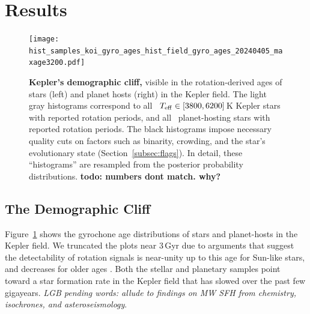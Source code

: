 \documentclass[11pt,twocolumn,tighten]{aastex63}
\begin{document}
\section{Results}
\label{sec:results}

\begin{figure}[!t]
	\begin{center}
		\leavevmode
		\texttt{[image: hist\_samples\_koi\_gyro\_ages\_hist\_field\_gyro\_ages\_20240405\_maxage3200.pdf]}
	\end{center}
	\vspace{-0.6cm}
	\caption{
		{\bf Kepler's demographic cliff,} visible in the
		rotation-derived ages of stars (left) and planet hosts
		(right) in the Kepler field.
		The 
		light gray histograms correspond to all
		\nuniqstarsantosrotteffcut\
		$T_{\rm eff}\in[3800,6200]\,$K Kepler stars with reported
		rotation periods, and all 
		\nplhoststarwgyroage\ planet-hosting stars with reported
		rotation periods.
		The black histograms impose necessary quality cuts
		on factors such as
		binarity, crowding, and the star's evolutionary state
		(Section~\ref{subsec:flags}).
		In detail, these ``histograms'' are resampled from the posterior
		probability distributions.
		{\bf todo: numbers dont match.  why?}
		\label{fig:hist_tgyro}
	}
\end{figure}

\subsection{The Demographic Cliff}

Figure~\ref{fig:hist_tgyro} shows the gyrochone age distributions of
stars and planet-hosts in the Kepler field.
We truncated the plots near $3$\,Gyr due to arguments that suggest the
detectability of rotation signals is near-unity up to this age for
Sun-like stars, and decreases for older ages
\citep{2022ApJ...937...94M}.
Both the stellar and planetary samples point toward a star formation
rate in the Kepler field that has slowed over the past few gigayears.
{\it LGB pending words: allude to findings on MW SFH from chemistry,
isochrones, and asteroseismology}.
\end{document}

